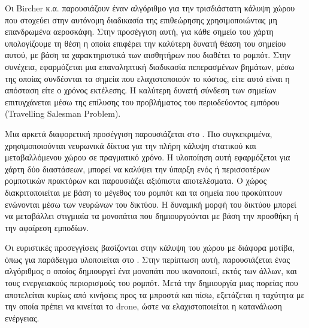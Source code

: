 Οι Bircher κ.α. \cite{bircher2015} παρουσιάζουν έναν αλγόριθμο για την τρισδιάστατη κάλυψη χώρου που στοχεύει στην αυτόνομη διαδικασία της επιθεώρησης χρησιμοποιώντας μη επανδρωμένα αεροσκάφη. Στην προσέγγιση αυτή, για κάθε σημείο του χάρτη υπολογίζουμε τη θέση η οποία επιφέρει την καλύτερη δυνατή θέαση του σημείου αυτού, με βάση τα χαρακτηριστικά των αισθητήρων που διαθέτει το ρομπότ. Στην συνέχεια, εφαρμόζεται μια επαναληπτική διαδικασία πεπερασμένων βημάτων, μέσω της οποίας συνδέονται τα σημεία που ελαχιστοποιούν το κόστος, είτε αυτό είναι η απόσταση είτε ο χρόνος εκτέλεσης. Η καλύτερη δυνατή σύνδεση των σημείων επιτυγχάνεται μέσω της επίλυσης του προβλήματος του περιοδεύοντος εμπόρου (Travelling Salesman Problem).

Μια αρκετά διαφορετική προσέγγιση παρουσιάζεται στο \cite{1262545}. Πιο συγκεκριμένα, χρησιμοποιούνται νευρωνικά δίκτυα για την πλήρη κάλυψη στατικού και μεταβαλλόμενου χώρου σε πραγματικό χρόνο. Η υλοποίηση αυτή εφαρμόζεται για χάρτη δύο διαστάσεων, μπορεί να καλύψει την ύπαρξη ενός ή περισσοτέρων ρομποτικών πρακτόρων και παρουσιάζει αξιόπιστα αποτελέσματα. Ο χώρος διακριτοποιείται με βάση το μέγεθος του ρομπότ και τα σημεία που προκύπτουν ενώνονται μέσω των νευρώνων του δικτύου. Η δυναμική μορφή του δικτύου μπορεί να μεταβάλλει στιγμιαία τα μονοπάτια που δημιουργούνται με βάση την προσθήκη ή την αφαίρεση εμποδίων.

Οι ευριστικές προσεγγίσεις βασίζονται στην κάλυψη του χώρου με διάφορα μοτίβα, όπως για παράδειγμα υλοποιείται στο \cite{DiFranco2016}. Στην περίπτωση αυτή, παρουσιάζεται ένας αλγόριθμος ο οποίος δημιουργεί ένα μονοπάτι που ικανοποιεί, εκτός των άλλων, και τους ενεργειακούς περιορισμούς του ρομπότ. Μετά την δημιουργία μιας πορείας που αποτελείται κυρίως από κινήσεις προς τα μπροστά και πίσω, εξετάζεται η ταχύτητα με την οποία πρέπει να κινείται το drone, ώστε να ελαχιστοποιείται η κατανάλωση ενέργειας.

